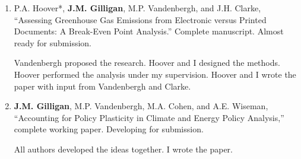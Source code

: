 %
%
\begin{enumerate}
    \item 
    P.A. Hoover*, \textbf{J.M. Gilligan}, M.P. Vandenbergh, and J.H. Clarke,
    ``Assessing Greenhouse Gas Emissions from Electronic versus Printed Documents: A Break-Even Point Analysis.''
    Complete manuscript. Almost ready for submission.
    \begin{credit}
        Vandenbergh proposed the research. Hoover and I designed the methods. Hoover performed the analysis under my supervision.
        Hoover and I wrote the paper with input from Vandenbergh and Clarke.
    \end{credit}

    \item 
    \textbf{J.M. Gilligan}, M.P. Vandenbergh, M.A. Cohen, and A.E. Wiseman, 
    ``Accounting for Policy Plasticity in Climate and Energy Policy Analysis,''
    complete working paper.
    Developing for submission.
    \begin{credit}
        All authors developed the ideas together. I wrote the paper.
    \end{credit}
    
%
\end{enumerate}
